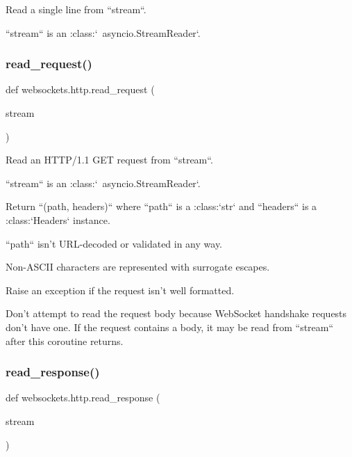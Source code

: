 \begin{DoxyVerb}Read a single line from ``stream``.

``stream`` is an :class:`~asyncio.StreamReader`.\end{DoxyVerb}
 \mbox{\label{namespacewebsockets_1_1http_aa060b2ffb58150775d151cfa7ac3e276}} 
\subsubsection{\texorpdfstring{read\+\_\+request()}{read\_request()}}
{\footnotesize\ttfamily def websockets.\+http.\+read\+\_\+request (\begin{DoxyParamCaption}\item[{}]{stream }\end{DoxyParamCaption})}

\begin{DoxyVerb}Read an HTTP/1.1 GET request from ``stream``.

``stream`` is an :class:`~asyncio.StreamReader`.

Return ``(path, headers)`` where ``path`` is a :class:`str` and
``headers`` is a :class:`Headers` instance.

``path`` isn't URL-decoded or validated in any way.

Non-ASCII characters are represented with surrogate escapes.

Raise an exception if the request isn't well formatted.

Don't attempt to read the request body because WebSocket handshake
requests don't have one. If the request contains a body, it may be
read from ``stream`` after this coroutine returns.\end{DoxyVerb}
 \mbox{\label{namespacewebsockets_1_1http_a4a2fa59574c998f90999402c995c0a1b}} 
\subsubsection{\texorpdfstring{read\+\_\+response()}{read\_response()}}
{\footnotesize\ttfamily def websockets.\+http.\+read\+\_\+response (\begin{DoxyParamCaption}\item[{}]{stream }\end{DoxyParamCaption})}

